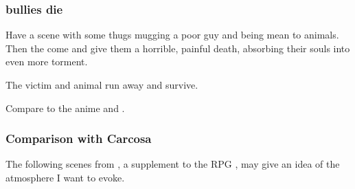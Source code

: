 




\subsubsection{\Malcuric{} bullies die}
Have a scene with some \Malcuric{} thugs mugging a poor guy and being mean to animals. Then the \daemons{} come and give them a horrible, painful death, absorbing their souls into even more torment. 

The victim and animal run away and survive. 

Compare to the anime \cite[episode 6]{Anime:TokyoMajin} and \cite{Anime:ElfenLied}. 





\subsubsection{Comparison with Carcosa}
The following scenes from \cite{RPG:CallofCthulhu:GreatOldOnes}, a supplement to the RPG \cite{RPG:CallofCthulhu}, may give an idea of the atmosphere I want to evoke. 

